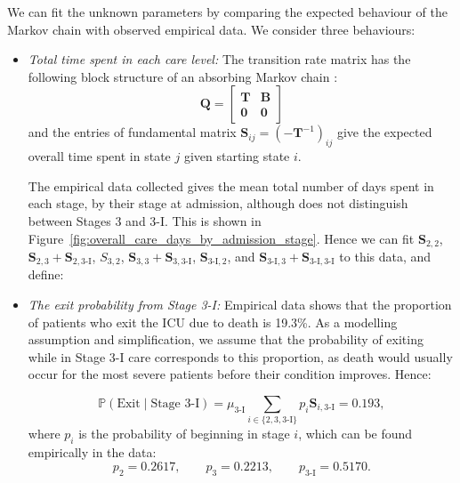 \documentclass{article}
\begin{document}
We can fit the unknown parameters by comparing the expected behaviour of the
Markov chain with observed empirical data.
We consider three behaviours:

\begin{itemize}
  \item \textit{Total time spent in each care level:}
  The transition rate matrix has the following block structure of an absorbing Markov chain \cite{stewart09}:
  \begin{equation}
  \mathbf{Q} = \begin{bmatrix}
  \mathbf{T} & \mathbf{B} \\
  \mathbf{0} & \mathbf{0}
  \end{bmatrix}
  \end{equation}
  and the entries of fundamental matrix $\mathbf{S}_{ij}=(-\mathbf{T}^{-1})_{ij}$
  give the expected overall time spent in state $j$ given starting state $i$.

  The empirical data collected gives the mean total number of days spent in each
  stage, by their stage at admission, although does not distinguish between
  Stages 3 and 3-I.
  This is shown in Figure~\ref{fig:overall_care_days_by_admission_stage}.
  Hence we can fit $\mathbf{S}_{2, 2}$,
  $\mathbf{S}_{2, 3} + \mathbf{S}_{2, 3\text{-I}}$, $S_{3, 2}$,
  $\mathbf{S}_{3, 3} + \mathbf{S}_{3, 3\text{-I}}$,
  $\mathbf{S}_{3\text{-I}, 2}$, and
  $\mathbf{S}_{3\text{-I}, 3} + \mathbf{S}_{3\text{-I}, 3\text{-I}}$ to this
  data, and define:

  \item \textit{The exit probability from Stage 3-I:}
  Empirical data shows that the proportion of patients who exit the ICU due to
  death is 19.3\%.
  As a modelling assumption and simplification, we assume that the probability
  of exiting while in Stage 3-I care corresponds to this proportion, as death
  would usually occur for the most severe patients before their condition
  improves.
  Hence:
  
  \begin{equation}
  \mathbb{P}(\text{Exit} \; | \; \text{Stage 3-I}) =
  \mu_{3\text{-I}} \sum_{i \in \{2, 3, 3\text{-I}\}} p_i \mathbf{S}_{i, 3\text{-I}} = 0.193,
  \end{equation}
  where $p_i$ is the probability of beginning in stage $i$, which can be found empirically in the data:
  \begin{equation*}
  p_2 = 0.2617, \qquad
  p_3 = 0.2213, \qquad
  p_{3\text{-I}} = 0.5170.
  \end{equation*}


\end{itemize}
\end{document}

